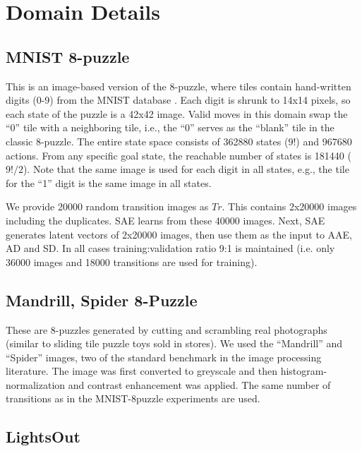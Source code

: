 \documentclass[11pt]{article}
\begin{document}
\section{Domain Details}

\label{sec:domain-details}

\subsection{MNIST 8-puzzle}

This is an image-based version of the 8-puzzle, where tiles contain
hand-written digits (0-9) from the MNIST database
\cite{lecun1998gradient}. Each digit is shrunk to 14x14 pixels, so each
state of the puzzle is a 42x42 image.  Valid moves in this domain swap
the ``0'' tile with a neighboring tile, i.e., the ``0'' serves as the
``blank'' tile in the classic 8-puzzle.  The entire state space consists
of 362880 states ($9!$) and 967680 actions.  From any specific goal state, the reachable
number of states is 181440 ($9!/2$).  Note that the same image is used
for each digit in all states, e.g., the tile for the ``1'' digit is the
same image in all states.

We provide 20000 random transition images as $Tr$.
This contains 2x20000 images including the duplicates.
SAE learns from these 40000 images.
Next, SAE generates latent vectors of 2x20000 images, then use them as the input to AAE, AD and SD.
In all cases training:validation ratio 9:1 is maintained
 (i.e. only 36000 images and 18000 transitions are used for training).

\subsection{Mandrill, Spider 8-Puzzle}

These are 8-puzzles generated by cutting and scrambling real photographs
(similar to sliding tile puzzle toys sold in stores). We used the
``Mandrill'' and ``Spider'' images, two of the standard benchmark in the image processing
literature.  The image was first converted to greyscale and then
histogram-normalization and contrast enhancement was applied.
The same number of transitions as in the MNIST-8puzzle experiments are used.

\subsection{LightsOut}
\end{document}
